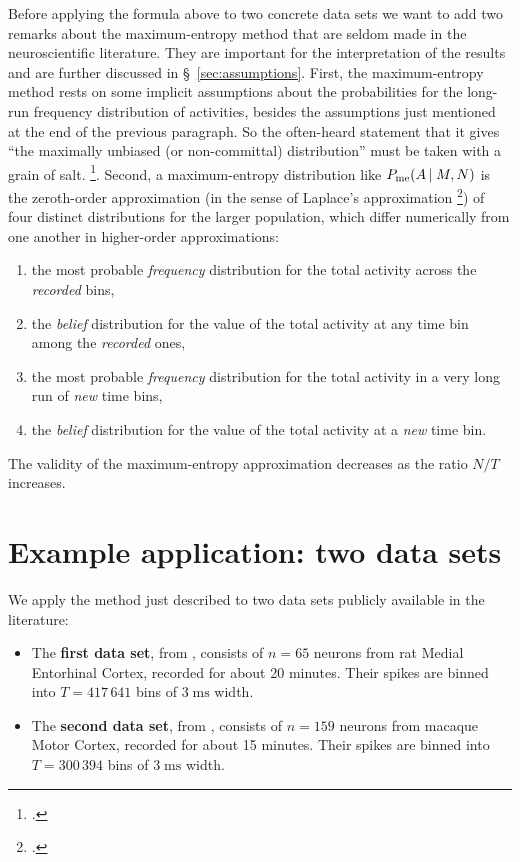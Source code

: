 \documentclass[\ifafour a4paper,12pt,\else a5paper,10pt,\fi%
onecolumn,oneside,article,%
british%
]{memoir}
\theoremstyle{remark}
\theoremstyle{innote}
\newcommand*{\citep}{\footcites}
\renewcommand*{\le}{\leqslant}%
\renewcommand*{\|}{\nonscript\,\vert\nonscript\;\mathopen{}}
\newcommand*{\sect}{\S}%
\newcommand*{\chap}{ch.}%
\newcommand*{\puzzle}{{\fontencoding{U}\fontfamily{fontawesometwo}\selectfont\symbol{225}}}
\newcommand{\mynote}[1]{ {\color{notecolour}\puzzle\ #1}}
\newcommand*{\yAv}{A}
\newcommand*{\yFF}{F}
\newcommand*{\yA}{\yAv}%
\newcommand*{\yH}{\varIota}
\newcommand*{\ynuu}{\nu}
\newcommand*{\px}{P_{\text{me}}}
\begin{document}
Before applying the formula above to two concrete data sets we want to add
two remarks about the maximum-entropy method that are seldom made in the
neuroscientific literature. They are important for the interpretation of
the results and are further discussed in \sect~\ref{sec:assumptions}.
First, the maximum-entropy
method %
rests on some implicit assumptions about the probabilities for the long-run
frequency distribution of activities, besides the assumptions just
mentioned at the end of the previous paragraph. So the often-heard
statement that it gives \enquote{the maximally unbiased (or non-committal)
  distribution} must be taken with a grain of salt. \citep[\mynote{move to
  sect}]{jaynes1986d_r1996,portamana2009,portamana2017}. Second, a
maximum-entropy distribution like $\px(\yA \| M, N)$ is the zeroth-order
approximation (in the sense of Laplace's approximation
\citep[\chap~4]{debruijn1958_r1961}{tierneyetal1986,strawderman2000}) of
four distinct distributions for the larger population, which differ
numerically from one another in higher-order approximations:
\begin{enumerate}[label=(\roman*)]
\item the most probable \emph{frequency} distribution for the total
  activity across the \emph{recorded} bins, %
\item the \emph{belief} distribution for the value of the total
  activity at any time bin among the \emph{recorded} ones,
\item the most probable \emph{frequency} distribution for the total
  activity in a very long run of \emph{new} time bins, %
\item the \emph{belief} distribution for the value of the total
  activity at a \emph{new} time bin.
\end{enumerate}
The validity of the maximum-entropy approximation decreases as the ratio
$N/T$ increases. 


\section{Example application: two data sets}
\label{sec:application}

We apply the method just described to two data sets publicly available in
the literature:
\begin{itemize}[wide]
\item The \textbf{first data set}, from \textcite[rat
  14147]{stensolaetal2012}, consists of $n=65$ neurons from rat Medial
  Entorhinal Cortex, recorded for about 20 minutes. Their spikes are binned
  into $T=417\,641$ bins of $3\;\textrm{ms}$ width.
\item The \textbf{second data set}, from \textcite[data courtesy by A.
  Riehle and T. Brochier]{rostamietal2016_r2017}, %
  consists of $n=159$ neurons from macaque Motor Cortex, recorded for about
  15 minutes. Their spikes are binned into $T=300\,394$ bins of
  $3\;\textrm{ms}$ width.
\end{itemize}
\end{document}
